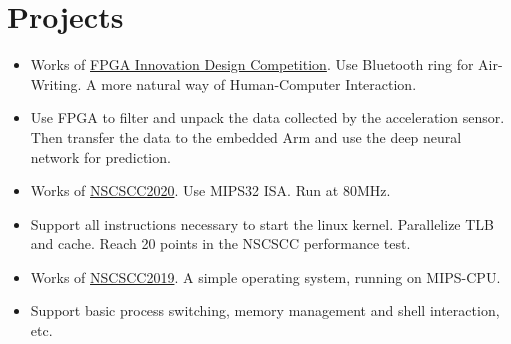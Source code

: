 \documentclass{resume}
\begin{document}
\section{{\bfseries Projects}}
\begin{itemize}[parsep=0.2ex]
    \item Works of \href{http://fpga.icisc.cn/}{FPGA Innovation Design Competition}. Use Bluetooth ring for Air-Writing. A more natural way of Human-Computer Interaction.
    \item Use FPGA to filter and unpack the data collected by the acceleration sensor. Then transfer the data to the embedded Arm and use the deep neural network for prediction.
\end{itemize}
\begin{itemize}[parsep=0.2ex]
    \item Works of \href{http://www.nscscc.org/}{NSCSCC2020}. Use MIPS32 ISA. Run at 80MHz.
    \item Support all instructions necessary to start the linux kernel. Parallelize TLB and cache. Reach 20 points in the NSCSCC performance test.
\end{itemize}
\begin{itemize}[parsep=0.2ex]
    \item Works of \href{http://www.nscscc.org/}{NSCSCC2019}. A simple operating system, running on MIPS-CPU.
    \item Support basic process switching, memory management and shell interaction, etc.
\end{itemize}
\end{document}
